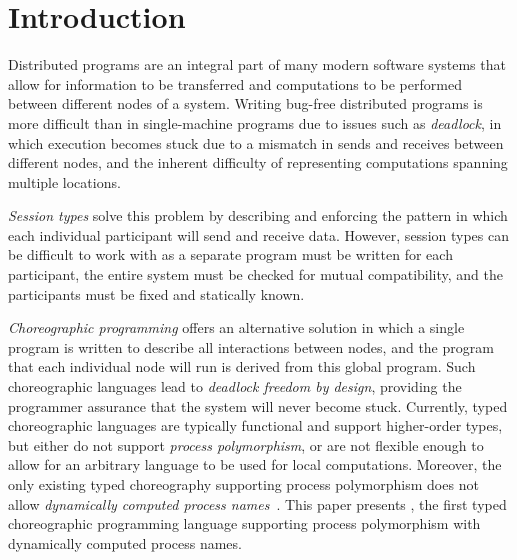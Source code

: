 \section{Introduction}
\label{sec:introduction}

Distributed programs are an integral part of many modern software systems that allow for information to be transferred and computations to be performed between different nodes of a system.
Writing bug-free distributed programs is more difficult than in single-machine programs due to issues such as \emph{deadlock}, in which execution becomes stuck due to a mismatch in sends and receives between different nodes, and the inherent difficulty of representing computations spanning multiple locations.

\emph{Session types} solve this problem by describing and enforcing the pattern in which each individual participant will send and receive data.
However, session types can be difficult to work with as a separate program must be written for each participant, the entire system must be checked for mutual compatibility, and the participants must be fixed and statically known.

\emph{Choreographic programming} offers an alternative solution in which a single program is written to describe all interactions between nodes, and the program that each individual node will run is derived from this global program.
Such choreographic languages lead to \emph{deadlock freedom by design}, providing the programmer assurance that the system will never become stuck.
Currently, typed choreographic languages are typically functional and support higher-order types, but either do not support \emph{process polymorphism},
or are not flexible enough to allow for an arbitrary language to be used for local computations.
Moreover, the only existing typed choreography supporting process polymorphism does not allow \emph{dynamically computed process names}~\citep{aliceorbob}.
This paper presents \langname, the first typed choreographic programming language
supporting process polymorphism with dynamically computed process names.

